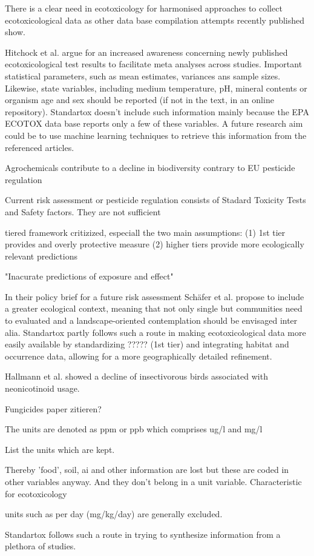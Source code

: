 There is a clear need in ecotoxicology for harmonised approaches to collect ecotoxicological data as other data base compilation attempts recently published show.

Hitchock et al. \citet{hitchcock_improving_2018} argue for an increased awareness concerning newly published ecotoxicological test results to facilitate meta analyses across studies. Important statistical parameters, such as mean estimates, variances ans sample sizes. Likewise, state variables, including medium temperature, pH, mineral contents or organism age and sex should be reported (if not in the text, in an online repository). Standartox doesn't include such information mainly because the EPA ECOTOX data base reports only a few of these variables. A future research aim could be to use machine learning techniques to retrieve this information from the referenced articles.

Agrochemicals contribute to a decline in biodiversity \citep{schafer_future_2019}
contrary to EU pesticide regulation

Current risk assessment or pesticide regulation consists of Stadard Toxicity Tests and Safety factors. They are not sufficient 

tiered framework critizized, especiall the two main assumptions:
(1) 1st tier provides and overly protective measure
(2) higher tiers provide more ecologically relevant predictions

"Inacurate predictions of exposure and effect" \citep{schafer_future_2019}

In their policy brief for a future risk assessment Schäfer et al. \citet{schafer_future_2019} propose to include a greater ecological context, meaning that not only single but communities need to evaluated and a landscape-oriented contemplation should be envisaged inter alia. Standartox partly follows such a route in making ecotoxicological data more easily available by standardizing ????? (1st tier) and integrating habitat and occurrence data, allowing for a more geographically detailed refinement.




Hallmann et al. \citet{hallmann_declines_2014} showed a decline of insectivorous birds associated with neonicotinoid usage.

Fungicides paper zitieren?


The units are denoted as ppm or ppb which comprises ug/l and mg/l

List the units which are kept. 

Thereby 'food', soil, ai and other information are lost but these are coded in other variables anyway. And they don't belong in a unit variable. Characteristic for ecotoxicology


units such as per day (mg/kg/day) are generally excluded.


Standartox follows such a route in trying to synthesize information from a plethora of studies.






\pagebreak